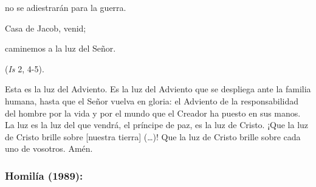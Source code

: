 \begin{body}
					no se adiestrarán para la guerra. 
					
					Casa de Jacob, venid; 
					
					caminemos a la luz del Señor. 
					
					(\emph{Is} 2, 4-5). 
					
					Esta es la luz del Adviento. Es la luz del Adviento que se despliega ante la familia humana, hasta que el Señor vuelva en gloria: el Adviento de la responsabilidad del hombre por la vida y por el mundo que el Creador ha puesto en sus manos. La luz es la luz del que vendrá, el príncipe de paz, es la luz de Cristo. ¡Que la luz de Cristo brille sobre {[}nuestra tierra{]} (\ldots{})! Que la luz de Cristo brille sobre cada uno de vosotros. Amén. 
				\end{body} 
			
			\subsubsection{Homilía (1989):}
			
			
